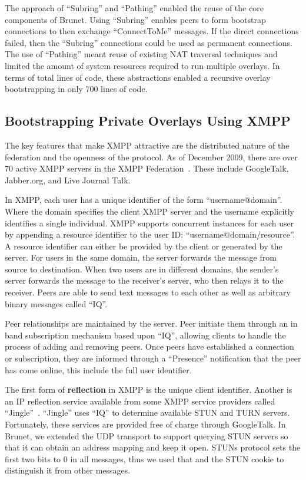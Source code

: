\documentclass[conference]{IEEEtran}
\begin{document}
The approach of ``Subring'' and ``Pathing'' enabled the reuse of the core
components of Brunet.  Using ``Subring'' enables peers to form bootstrap
connections to then exchange ``ConnectToMe'' messages.  If the direct
connections failed, then the ``Subring'' connections could be used as permanent
connections.  The use of ``Pathing'' meant reuse of existing NAT traversal
techniques and limited the amount of system resources required to run multiple
overlays.  In terms of total lines of code, these abstractions enabled a
recursive overlay bootstrapping in only 700 lines of code.

\subsection{Bootstrapping Private Overlays Using XMPP}
\label{xmpp_bootstrapping}

The key features that make XMPP attractive are the distributed nature of the
federation and the openness of the protocol.  As of December 2009, there are
over 70 active XMPP servers in the XMPP Federation~\cite{xmpp_servers}.  These
include GoogleTalk, Jabber.org, and Live Journal Talk.

In XMPP, each user has a unique identifier of the form ``username@domain''.
Where the domain specifies the client XMPP server and the username explicitly
identifies a single individual.  XMPP supports concurrent instances for each
user by appending a resource identifier to the user ID:
``username@domain/resource''.  A resource identifier can either be provided by
the client or generated by the server.  For users in the same domain, the
server forwards the message from source to destination.  When two users are in
different domains, the sender's server forwards the message to the receiver's
server, who then relays it to the receiver.  Peers are able to send text
messages to each other as well as arbitrary binary messages called ``IQ''.

Peer relationships are maintained by the server.  Peer initiate them through an
in band subscription mechanism based upon ``IQ'', allowing clients to handle
the process of adding and removing peers.  Once peers have established a
connection or subscription, they are informed through a ``Presence''
notification that the peer has come online, this include the full user
identifier.

The first form of \textbf{reflection} in XMPP is the unique client identifier.
Another is an IP reflection service available from some XMPP service providers
called ``Jingle''~\cite{jingle}.  ``Jingle'' uses ``IQ'' to determine available
STUN and TURN servers.  Fortunately, these services are provided free of charge
through GoogleTalk.  In Brunet, we extended the UDP transport to support
querying STUN servers so that it can obtain an address mapping and keep it
open.  STUNs protocol sets the first two bits to 0 in all messages, thus we
used that and the STUN cookie to distinguish it from other messages.
\end{document}

